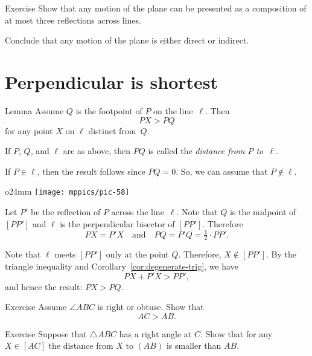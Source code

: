 \begin{thm}{Exercise}\label{ex:3-reflections}
Show that any motion of the plane can be presented as a 
composition of at most three reflections across lines.

Conclude that any motion of the plane is either direct or indirect.
\end{thm} 

\section{Perpendicular is shortest}
\label{sec:perp<oblique}

\begin{thm}[\abs]{Lemma}\label{lem:perp<oblique}
Assume $Q$ is the footpoint of $P$ on the line~$\ell$.
Then 
$$PX>PQ$$
for any point $X$ on $\ell$ distinct from~$Q$. 
\end{thm}

If $P$, $Q$, and $\ell$ are as above, 
then $PQ$ is called the \label{distance!from a point to a line}\emph{distance from $P$ to~$\ell$}. 

If $P\in \ell$, 
then the result follows since $PQ=0$.
So, we can assume that $P\notin \ell$.

\begin{wrapfigure}{o}{24mm}
\centering
\texttt{[image: mppics/pic-58]}
\vskip3mm
\end{wrapfigure}

Let $P'$ be the reflection of $P$ across the line~$\ell$.
Note that $Q$ is the midpoint of $[PP']$
and $\ell$ is the perpendicular bisector of $[PP']$.
Therefore
$$PX=P'X
\quad
\text{and}
\quad
PQ=P'Q=\tfrac12\cdot PP'.$$

Note that $\ell$ meets $[PP']$ only at the point $Q$.
Therefore, $X\notin [PP']$.
By the triangle inequality and Corollary~\ref{cor:degenerate-trig}, we have 
$$PX+P'X>PP',$$
and hence the result: $PX>PQ$.
\qeds

\begin{thm}{Exercise}\label{ex:obtuce}
Assume $\angle ABC$ is right or obtuse.
Show that 
\[AC>AB.\]

\end{thm}

\begin{thm}{Exercise}\label{ex:right-triangle-inq}
Suppose that $\triangle ABC$ has a right angle at $C$.
Show that for any $X\in [AC]$ the distance from $X$ to $(AB)$ is smaller than $AB$.
\end{thm}



